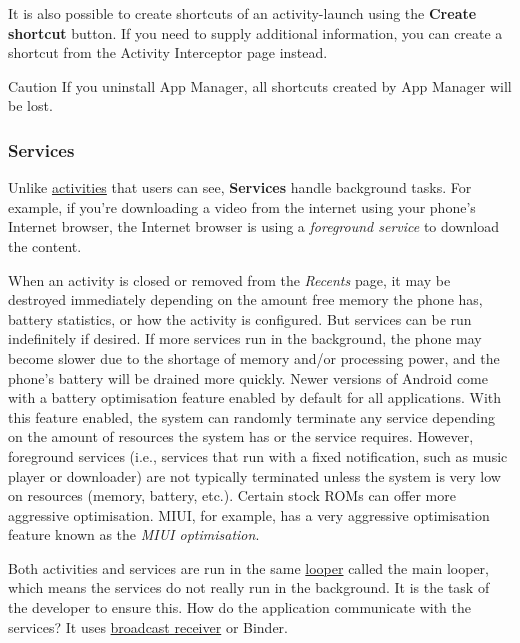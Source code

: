 It is also possible to create shortcuts of an activity-launch using the \textbf{Create shortcut}
button. If you need to supply additional information, you can create a shortcut from the Activity
Interceptor page instead.

\begin{danger}{Caution}
    If you uninstall App Manager, all shortcuts created by App Manager will be lost.
\end{danger}

\subsubsection{Services}\label{subsubsec:details:servcies} %
Unlike \hyperref[subsubsec:activities]{activities} that users can see, \textbf{Services} handle background tasks. For example,
if you're downloading a video from the internet using your phone's Internet browser, the Internet browser is using a
\textit{foreground service} to download the content.

When an activity is closed or removed from the \textit{Recents} page, it may be destroyed
immediately depending on the amount free memory the phone has, battery statistics, or how the
activity is configured. But services can be run indefinitely if desired. If more services run in the
background, the phone may become slower due to the shortage of memory and/or processing power, and
the phone's battery will be drained more quickly. Newer versions of Android come with a battery
optimisation feature enabled by default for all applications. With this feature enabled, the system
can randomly terminate any service depending on the amount of resources the system has or the
service requires. However, foreground services (i.e., services that run with a fixed notification,
such as music player or downloader) are not typically terminated unless the system is very low on
resources (memory, battery, etc.). Certain stock ROMs can offer more aggressive optimisation. MIUI,
for example, has a very aggressive optimisation feature known as the \textit{MIUI optimisation}.

Both activities and services are run in the same \href{https://stackoverflow.com/questions/7597742}{looper} called
the main looper, which means the services do not really run in the background. It is the task of the developer to
ensure this. How do the application communicate with the services? It uses
\hyperref[subsubsec:app-details-receivers]{broadcast receiver} or Binder.

